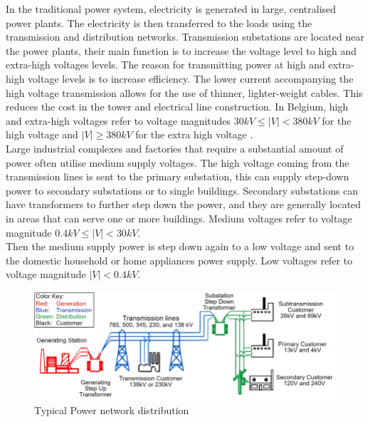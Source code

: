 In the traditional power system, electricity is generated in large, centralised power plants. The electricity is then transferred to the loads using the transmission and distribution networks. Transmission substations are located near the power plants, their main function is to increase the voltage level to high and extra-high voltages levels. The reason for transmitting power at high and extra-high voltage levels is to increase efficiency. The lower current accompanying the high voltage transmission allows for the use of thinner, lighter-weight cables. This reduces the cost in the tower and electrical line construction. In Belgium, high and extra-high voltages refer to voltage magnitudes $30 kV \leq |V| < 380 kV$ for the high voltage and $|V| \geq 380 kV$ for the extra high voltage \cite{elia}. \\
Large industrial complexes and factories that require a substantial amount of power often utilise medium supply voltages. The high voltage coming from the transmission lines is sent to the primary substation, this can supply step-down power to secondary substations or to single buildings. Secondary substations can have transformers to further step down the power, and they are generally located in areas that can serve one or more buildings. Medium voltages refer to voltage magnitude $0.4 kV \leq |V| < 30 kV$. \\
Then the medium supply power is step down again to a low voltage and sent to the domestic household or home appliances power supply. Low voltages refer to voltage magnitude $|V| < 0.4 kV$. \\
\begin{figure}[H]
\centering
    \includegraphics[width=.9\linewidth]{images/Background/DN/Basic-Structure-of-the-Electric-Power-System-5.png }
\caption[Power network distribution]{Typical Power network distribution \cite{USblackout}}
\end{figure}


